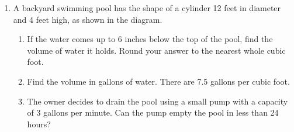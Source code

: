 \documentclass[12pt, twoside]{article}
\begin{document}
\begin{enumerate}
\newpage
  \item A backyard swimming pool has the shape of a cylinder 12 feet in diameter and 4 feet high, as shown in the diagram.
  \begin{enumerate}
    \item If the water comes up to 6 inches below the top of the pool, find the volume of water it holds. Round your answer to the nearest whole cubic foot.
    \begin{flushright}
  \end{flushright} \vspace{2cm}
  \item Find the volume in gallons of water. There are 7.5 gallons per cubic foot. \vspace{4cm}
  \item The owner decides to drain the pool using a small pump with a capacity of 3 gallons per minute. Can the pump empty the pool in less than 24 hours?
\end{enumerate}

\end{enumerate}
\end{document}
